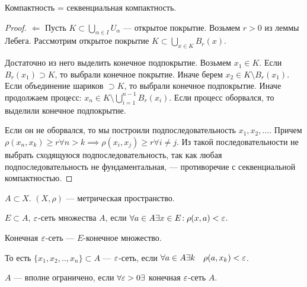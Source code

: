 \begin{theorem}
    Компактность = секвенциальная компактность.
\end{theorem}
\begin{proof}
    $\Leftarrow$ Пусть  $K \subset \bigcup\limits_{\alpha \in I} U_\alpha$ --- открытое покрытие. Возьмем $r > 0$ из леммы Лебега. Рассмотрим открытое покрытие  $K \subset \bigcup\limits_{x \in K} B_r(x)$.

    Достаточно из него выделить конечное подпокрытие. Возьмем  $x_1 \in K$. Если $B_r(x_1) \supset K$, то выбрали конечное покрытие. Иначе берем $x_2 \in K \setminus B_r(x_1)$. Если объединение шариков $\supset K$, то выбрали конечное подпокрытие. Иначе продолжаем процесс:  $x_n \in K \setminus \bigcup_{i=1}^{n-1}B_r(x_i)$. Если процесс оборвался, то выделили конечное подпокрытие.

    Если он не оборвался, то мы построили подпоследовательность $x_1, x_2,\ldots$. Причем  $\rho(x_n, x_k) \ge r \forall n > k \implies \rho(x_i, x_j) \ge r \forall i \ne j$. Из такой последовательности не выбрать сходящуюся подпоследовательность, так как любая подпоследовательность не фундаментальная, --- противоречие с секвенциальной компактностью.
\end{proof}
\begin{definition}
    $A \subset X$.  $(X, \rho)$ --- метрическая пространство.

     $E \subset A$,  $\varepsilon$-сеть множества  $A$, если  $\forall a \in A \exists x \in E\!: \rho(x, a) < \varepsilon$.

     Конечная  $\varepsilon$-сеть ---  $E$-конечное множество.

     То есть $\{x_1, x_2,.., x_n\} \subset A$ --- $\varepsilon$-сеть, если  $\forall a \in A \exists k\quad \rho(a, x_k) < \varepsilon$.
\end{definition}
\begin{definition}
    $A$ --- вполне ограничено, если  $\forall \varepsilon > 0 \exists$ конечная $\varepsilon$-сеть  $A$.
\end{definition}

